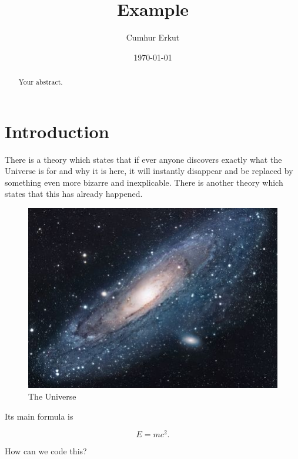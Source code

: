 \documentclass{article}
\title{Example}
\author{Cumhur Erkut}
\date{\today}
\begin{document}
\maketitle

\begin{abstract}
Your abstract.
\end{abstract}

\section{Introduction}
There is a theory which states that if ever anyone discovers exactly what the Universe is for and why it is here, it will instantly disappear and be replaced by something even more bizarre and inexplicable.
There is another theory which states that this has already happened.

\begin{figure}[h!]
\centering
\includegraphics[scale=1.7]{universe}
\caption{The Universe}
\label{fig:universe}
\end{figure}

Its main formula is 

\begin{equation}
    E = mc^2 .
\end{equation}

How can we code this? 
\end{document}
